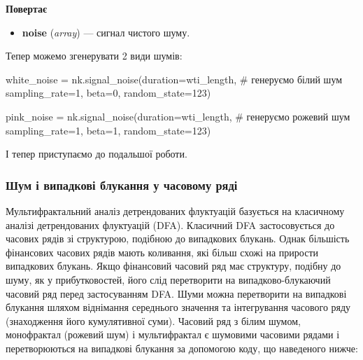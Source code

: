 \documentclass[
  letterpaper,
]{report}
\newenvironment{Shaded}{\begin{snugshade}}{\end{snugshade}}
\newcommand{\CommentTok}[1]{\textcolor[rgb]{0.37,0.37,0.37}{#1}}
\newcommand{\DecValTok}[1]{\textcolor[rgb]{0.68,0.00,0.00}{#1}}
\newcommand{\NormalTok}[1]{\textcolor[rgb]{0.00,0.23,0.31}{#1}}
\newcommand{\OperatorTok}[1]{\textcolor[rgb]{0.37,0.37,0.37}{#1}}
\providecommand{\tightlist}{%
  \setlength{\itemsep}{0pt}\setlength{\parskip}{0pt}}\usepackage{longtable,booktabs,array}
\begin{document}
\textbf{Повертає}

\begin{itemize}
\tightlist
\item
  \textbf{noise} (\emph{array}) --- сигнал чистого шуму.
\end{itemize}

Тепер можемо згенерувати 2 види шумів:

\begin{Shaded}
\begin{Highlighting}[]
\NormalTok{white\_noise }\OperatorTok{=}\NormalTok{ nk.signal\_noise(duration}\OperatorTok{=}\NormalTok{wti\_length, }\CommentTok{\# генеруємо білий шум }
\NormalTok{                              sampling\_rate}\OperatorTok{=}\DecValTok{1}\NormalTok{, }
\NormalTok{                              beta}\OperatorTok{=}\DecValTok{0}\NormalTok{, }
\NormalTok{                              random\_state}\OperatorTok{=}\DecValTok{123}\NormalTok{)}

\NormalTok{pink\_noise }\OperatorTok{=}\NormalTok{ nk.signal\_noise(duration}\OperatorTok{=}\NormalTok{wti\_length,  }\CommentTok{\# генеруємо рожевий шум }
\NormalTok{                              sampling\_rate}\OperatorTok{=}\DecValTok{1}\NormalTok{, }
\NormalTok{                              beta}\OperatorTok{=}\DecValTok{1}\NormalTok{, }
\NormalTok{                              random\_state}\OperatorTok{=}\DecValTok{123}\NormalTok{)}
\end{Highlighting}
\end{Shaded}

І тепер приступаємо до подальшої роботи.

\hypertarget{ux448ux443ux43c-ux456-ux432ux438ux43fux430ux434ux43aux43eux432ux456-ux431ux43bux443ux43aux430ux43dux43dux44f-ux443-ux447ux430ux441ux43eux432ux43eux43cux443-ux440ux44fux434ux456}{%
\subsubsection{Шум і випадкові блукання у часовому
ряді}\label{ux448ux443ux43c-ux456-ux432ux438ux43fux430ux434ux43aux43eux432ux456-ux431ux43bux443ux43aux430ux43dux43dux44f-ux443-ux447ux430ux441ux43eux432ux43eux43cux443-ux440ux44fux434ux456}}

Мультифрактальний аналіз детрендованих флуктуацій базується на
класичному аналізі детрендованих флуктуацій (DFA). Класичний DFA
застосовується до часових рядів зі структурою, подібною до випадкових
блукань. Однак більшість фінансових часових рядів мають коливання, які
більш схожі на прирости випадкових блукань. Якщо фінансовий часовий ряд
має структуру, подібну до шуму, як у прибутковостей, його слід
перетворити на випадково-блукаючий часовий ряд перед застосуванням DFA.
Шуми можна перетворити на випадкові блукання шляхом віднімання
середнього значення та інтегрування часового ряду (знаходження його
кумулятивної суми). Часовий ряд з білим шумом, монофрактал (рожевий шум)
і мультифрактал є шумовими часовими рядами і перетворюються на випадкові
блукання за допомогою коду, що наведеного нижче:
\end{document}
